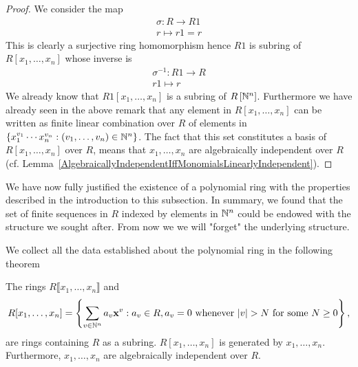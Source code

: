 \begin{proof}
    We consider the map
    \begin{gather*}
        \sigma : R \rightarrow R1\\
        r\mapsto r1 = r
    \end{gather*}
    This is clearly a surjective ring homomorphism hence $R1$ is subring of $R[x_1,\dots,x_n]$ whose inverse is 
    \begin{gather*}
        \sigma^{-1}: R1 \rightarrow R\\
        r1 \mapsto r
    \end{gather*}
    We already know that $R1[x_1,\dots,x_n]$ is a subring of $R\left[\mathbb{N}^n\right]$. Furthermore we have already seen in the above remark that any element in $R\left[x_1,\dots,x_n\right]$ can be written as finite linear combination over $R$ of elements in $\left\{x_1^{v_1}\cdots x_n^{v_n} : (v_1,\dots,v_n)\in \mathbb{N}^n \right\}$. The fact that this set constitutes a basis of $R\left[x_1,\dots,x_n\right]$ over $R$, means that $x_1,\dots,x_n$ are algebraically independent over $R$ (cf. Lemma~\ref{AlgebraicallyIndependentIffMonomialsLinearlyIndependent}).
\end{proof}
\begin{remark}
    We have now fully justified the existence of a polynomial ring with the properties described in the introduction to this subsection. In summary, we found that the set of finite sequences in $R$ indexed by elements in $\mathbb{N}^n$ could be endowed with the structure we sought after. From now we we will "forget" the underlying structure.
\end{remark}
We collect all the data established about the polynomial ring in the following theorem
\begin{theorem}\label{PolynomialRingActsLikePolynomialRing}
    The rings $R\llbracket x_1,\dots,x_n\rrbracket$ and
    $$R[x_1,\dots,x_n] = \left\{ \sum_{v\in \mathbb{N}^n} a_v\mathbf{x}^v : a_v\in R, a_v = 0 \text{ whenever } \vert v \vert > N \text{ for some } N \geq 0  \right\},$$
    are rings containing $R$ as a subring. $R[x_1,\dots,x_n]$ is generated by $x_1,\dots,x_n$. Furthermore, $x_1,\dots,x_n$ are algebraically independent over $R$.
\end{theorem}
